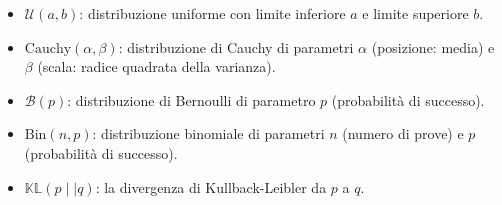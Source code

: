 \documentclass[
  11pt,
]{krantz}
\theoremstyle{definition}
\theoremstyle{definition}
\theoremstyle{definition}
\theoremstyle{definition}
\theoremstyle{remark}
\begin{document}
\begin{itemize}
\item
  \(\mathcal{U}(a, b)\): distribuzione uniforme con limite inferiore \(a\) e limite superiore \(b\).
\item
  \(\mbox{Cauchy}(\alpha, \beta)\): distribuzione di Cauchy di parametri \(\alpha\) (posizione: media) e \(\beta\) (scala: radice quadrata della varianza).
\item
  \(\mathcal{B}(p)\): distribuzione di Bernoulli di parametro \(p\) (probabilità di successo).
\item
  \(\mbox{Bin}(n, p)\): distribuzione binomiale di parametri \(n\) (numero di prove) e \(p\) (probabilità di successo).
\item
  \(\mathbb{KL} (p \mid\mid q)\): la divergenza di Kullback-Leibler da \(p\) a \(q\).
\end{itemize}

  

\printindex
\end{document}
